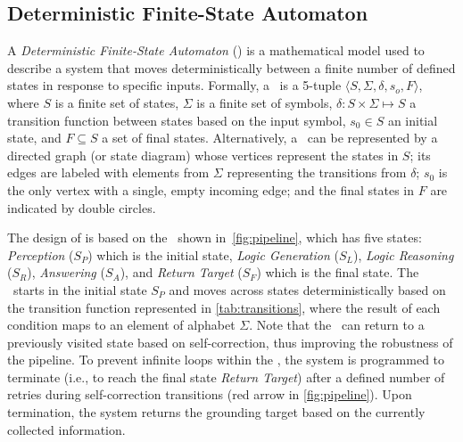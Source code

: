\subsection{Deterministic Finite-State Automaton}
\label{sec:automaton}

A \emph{Deterministic Finite-State Automaton} (\dfa) is a mathematical model used to describe a system that moves deterministically between a finite number of defined states in response to specific inputs. Formally, a \dfa\ is a 5-tuple $\langle S, \Sigma, \delta, s_o, F \rangle$, where $S$ is a finite set of states, $\Sigma$ is a finite set of symbols, $\delta: S \times \Sigma \mapsto S$ a transition function between states based on the input symbol, $s_0 \in S$ an initial state, and $F\subseteq S$ a set of final states. Alternatively, a \dfa\ can be represented by a directed graph (or state diagram) whose vertices represent the states in $S$; its edges are labeled with elements from $\Sigma$ representing the transitions from $\delta$; $s_0$ is the only vertex with a single, empty incoming edge; and the final states in $F$ are indicated by double circles.

The design of \methodname{} is based on the \dfa\ shown in~\autoref{fig:pipeline}, which has five states: \emph{Perception} ($S_P$) which is the initial state, \emph{Logic Generation} ($S_L$), \emph{Logic Reasoning} ($S_R$),  \emph{Answering} ($S_A$), and \emph{Return Target} ($S_F$) which is the final state. The \dfa\ starts in the initial state $S_P$ and moves across states deterministically based on the transition function represented in \autoref{tab:transitions}, where the result of each condition maps to an element of alphabet $\Sigma$. Note that the \dfa\ can return to a previously visited state based on self-correction, thus improving the robustness of the pipeline. To prevent infinite loops within the \dfa, the system is programmed to terminate (i.e., to reach the final state \emph{Return Target}) after a defined number of retries during self-correction transitions (red arrow in \autoref{fig:pipeline}). Upon termination, the system returns the grounding target based on the currently collected information. 

